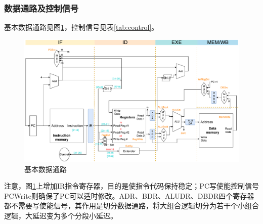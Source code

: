 \subsubsection{数据通路及控制信号}
\qquad 基本数据通路见图\ref{fig:datapath}，控制信号见表\ref{tab:control}。
\begin{figure}[H]
\centering
\includegraphics[width=\linewidth]{fig/Datapath-All.pdf}
\caption{基本数据通路}
\label{fig:datapath}
\end{figure}
\par 注意，图\ref{fig:datapath}上增加IR指令寄存器，目的是使指令代码保持稳定；PC写使能控制信号PCWrite则确保了PC可以适时修改。ADR、BDR、ALUDR、DBDR四个寄存器都不需要写使能信号，其作用是切分数据通路，将大组合逻辑切分为若干个小组合逻辑，大延迟变为多个分段小延迟。
